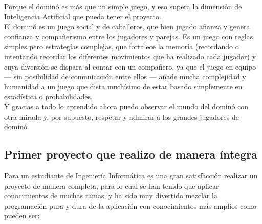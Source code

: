 Porque el dominó es más que un simple juego, y eso supera la dimensión de Inteligencia Artificial que pueda tener el
proyecto. \\

El dominó es un juego social y de caballeros, que bien jugado afianza y genera confianza y compañerismo entre los jugadores
y parejas. Es un juego con reglas simples pero estrategias complejas, que fortalece la memoria (recordando o intentando
recordar los diferentes movimientos que ha realizado cada jugador) y cuya diversión se dispara al contar con un compañero,
ya que el juego en equipo --- sin posibilidad de comunicación entre ellos --- añade mucha complejidad y humanidad a un
juego que dista muchísimo de estar basado simplemente en estadística o probabilidades. \\

Y gracias a todo lo aprendido ahora puedo observar el mundo del dominó con otra mirada y, por supuesto, respetar y admirar
a los grandes jugadores de dominó.

\subsection{Primer proyecto que realizo de manera íntegra}

Para un estudiante de Ingeniería Informática es una gran satisfacción realizar un proyecto de manera completa, para lo cual
se han tenido que aplicar conocimientos de muchas ramas, y ha sido muy divertido mezclar la programación pura y dura
de la aplicación con conocimientos más amplios como pueden ser:

